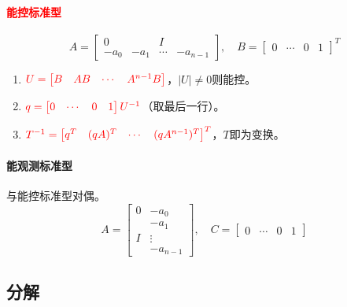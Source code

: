 \documentclass[
12pt, %
a4paper, 
oneside, %
]{scrartcl}
\begin{document}
\paragraph{\textcolor{red}{能控标准型}}
$$ A = \begin{bmatrix} 0 & & I & \\ -a_0 & -a_1 & \cdots & -a_{n - 1} \end{bmatrix}, \quad B = \begin{bmatrix} 0 & \cdots & 0 & 1 \end{bmatrix}^T $$
\begin{enumerate}
\item $ \textcolor{red}{U = \begin{bmatrix} B & AB & \cdots & A^{n - 1} B \end{bmatrix}} $，$ |U| \neq 0 $则能控。
\item $ \textcolor{red}{q = \begin{bmatrix} 0 & \cdots & 0 & 1 \end{bmatrix} U^{-1}} $（取最后一行）。
\item $ \textcolor{red}{T^{-1} = \begin{bmatrix} q^T & (q A)^T & \cdots & (q A^{n - 1})^T \end{bmatrix}^T} $，$ T $即为变换。
\end{enumerate}
\paragraph{能观测标准型}
与能控标准型对偶。
$$ A = \begin{bmatrix} 0 & -a_0 \\ & -a_1 \\ I & \vdots \\ & -a_{n - 1} \end{bmatrix}, \quad C = \begin{bmatrix} 0 & \cdots & 0 & 1 \end{bmatrix} $$
\subsection[分解]{分解}
\end{document}
